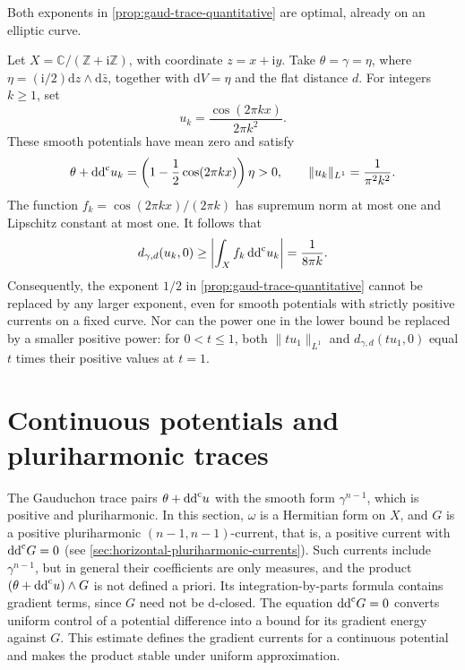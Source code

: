 Both exponents in \cref{prop:gaud-trace-quantitative} are optimal, already on an elliptic curve.

\begin{example}\label{ex:gaud-trace-sharp-exponents}
Let $X=\mathbb C/(\mathbb Z+\mathrm{i}\mathbb Z)$, with coordinate $z=x+\mathrm{i}y$. Take $\theta=\gamma=\eta$, where $\eta=(\mathrm{i}/2)\mathrm{d}z\wedge\mathrm{d}\bar z$, together with $\mathrm{d}V=\eta$ and the flat distance $d$. For integers $k\geq1$, set
\[
 u_k=\frac{\cos(2\pi kx)}{2\pi k^2}.
\]
These smooth potentials have mean zero and satisfy
\[
 \theta+\mathrm{dd}^{\mathrm{c}} u_k=\left(1-\frac12\cos(2\pi kx)\right)\eta>0,
 \qquad \|u_k\|_{L^1}=\frac1{\pi^2k^2}.
\]
The function $f_k=\cos(2\pi kx)/(2\pi k)$ has supremum norm at most one and Lipschitz constant at most one. It follows that
\[
 d_{\gamma,d}(u_k,0)
 \geq\left|\int_Xf_k\,\mathrm{dd}^{\mathrm{c}} u_k\right|
 =\frac1{8\pi k}.
\]
Consequently, the exponent $1/2$ in \cref{prop:gaud-trace-quantitative} cannot be replaced by any larger exponent, even for smooth potentials with strictly positive currents on a fixed curve. Nor can the power one in the lower bound be replaced by a smaller positive power: for $0<t\leq1$, both $\|tu_1\|_{L^1}$ and $d_{\gamma,d}(tu_1,0)$ equal $t$ times their positive values at $t=1$.
\end{example}

\section{Continuous potentials and pluriharmonic traces}
\label{sec:continuous-pluriharmonic-traces}

The Gauduchon trace pairs $\theta+\mathrm{dd}^{\mathrm{c}} u$ with the smooth form $\gamma^{n-1}$, which is positive and pluriharmonic. In this section, $\omega$ is a Hermitian form on $X$, and $G$ is a positive pluriharmonic $(n-1,n-1)$-current, that is, a positive current with $\mathrm{dd}^{\mathrm{c}} G=0$ (see \cref{sec:horizontal-pluriharmonic-currents}). Such currents include $\gamma^{n-1}$, but in general their coefficients are only measures, and the product $(\theta+\mathrm{dd}^{\mathrm{c}} u)\wedge G$ is not defined a priori. Its integration-by-parts formula contains gradient terms, since $G$ need not be $\mathrm d$-closed. The equation $\mathrm{dd}^{\mathrm{c}} G=0$ converts uniform control of a potential difference into a bound for its gradient energy against $G$. This estimate defines the gradient currents for a continuous potential and makes the product stable under uniform approximation.

